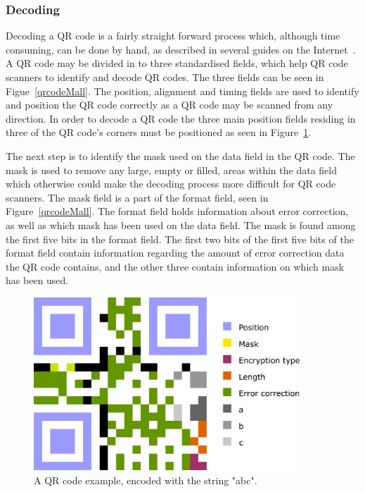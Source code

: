 \subsubsection{Decoding}
Decoding a QR code is a fairly straight forward process which, although time consuming, can be done by hand, as described in several guides on the Internet~\cite{qrcodeDecoding2, qrcodeDecoding, qrcodeDecoding3}. A QR code may be divided in to three standardised fields, which help QR code scanners to identify and decode QR codes. The three fields can be seen in Figue~\ref{qrcodeMall}. The position, alignment and timing fields are used to identify and position the QR code correctly as a QR code may be scanned from any direction. In order to decode a QR code the three main position fields residing in three of the QR code's corners must be positioned as seen in Figure~\ref{qrcodeExample}.

The next step is to identify the mask used on the data field in the QR code. The mask is used to remove any large, empty or filled, areas within the data field which otherwise could make the decoding process more difficult for QR code scanners. The mask field is a part of the format field, seen in Figure~\ref{qrcodeMall}. The format field holds information about error correction, as well as which mask has been used on the data field. The mask is found among the first five bits in the format field. The first two bits of the first five bits of the format field contain information regarding the amount of error correction data the QR code contains, and the other three contain information on which mask has been used.

	\begin{figure}[H]%
		\centering
		\includegraphics[width=100mm]{images/qrcodeexample}
		\caption{A QR code example, encoded with the string "abc".}
		\label{qrcodeExample}
	\end{figure}

